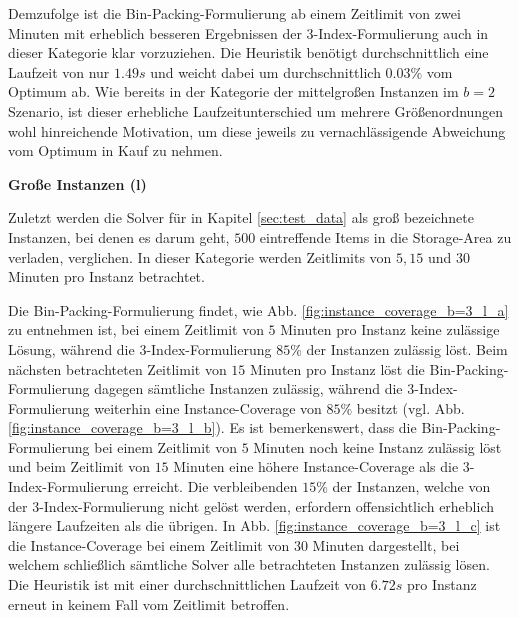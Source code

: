 Demzufolge ist die Bin-Packing-Formulierung ab einem Zeitlimit von zwei Minuten mit erheblich besseren Ergebnissen der 3-Index-Formulierung auch in dieser Kategorie klar vorzuziehen.
Die Heuristik benötigt durchschnittlich eine Laufzeit von nur $1.49s$ und weicht dabei um durchschnittlich
$0.03 \%$ vom Optimum ab. Wie bereits in der Kategorie der mittelgroßen Instanzen im $b = 2$ Szenario, ist dieser erhebliche Laufzeitunterschied um mehrere Größenordnungen wohl hinreichende Motivation, um diese jeweils zu vernachlässigende Abweichung vom Optimum in Kauf zu nehmen.

\textbf{Große Instanzen (l)}

Zuletzt werden die Solver für in Kapitel \ref{sec:test_data} als groß bezeichnete Instanzen,
bei denen es darum geht, $500$ eintreffende Items in die Storage-Area zu verladen, verglichen.
In dieser Kategorie werden Zeitlimits von $5, 15$ und $30$ Minuten pro Instanz betrachtet.

Die Bin-Packing-Formulierung findet, wie Abb. \ref{fig:instance_coverage_b=3_l_a} zu entnehmen ist,
bei einem Zeitlimit von $5$ Minuten pro Instanz keine zulässige Lösung, während die 3-Index-Formulierung
$85 \%$ der Instanzen zulässig löst. Beim nächsten betrachteten Zeitlimit von $15$ Minuten pro Instanz löst die Bin-Packing-Formulierung dagegen sämtliche Instanzen zulässig, während die 3-Index-Formulierung weiterhin eine Instance-Coverage von $85 \%$ besitzt (vgl. Abb. \ref{fig:instance_coverage_b=3_l_b}). Es ist bemerkenswert, dass die Bin-Packing-Formulierung bei einem Zeitlimit von $5$ Minuten noch keine Instanz zulässig löst und beim Zeitlimit
von $15$ Minuten eine höhere Instance-Coverage als die 3-Index-Formulierung erreicht. Die verbleibenden $15 \%$ der
Instanzen, welche von der 3-Index-Formulierung nicht gelöst werden, erfordern offensichtlich erheblich längere Laufzeiten als die übrigen. In Abb. \ref{fig:instance_coverage_b=3_l_c} ist die Instance-Coverage bei einem Zeitlimit von $30$ Minuten dargestellt, bei welchem schließlich sämtliche Solver alle betrachteten Instanzen zulässig lösen. Die Heuristik ist mit einer durchschnittlichen Laufzeit von $6.72s$ pro Instanz erneut in keinem Fall vom Zeitlimit betroffen.

